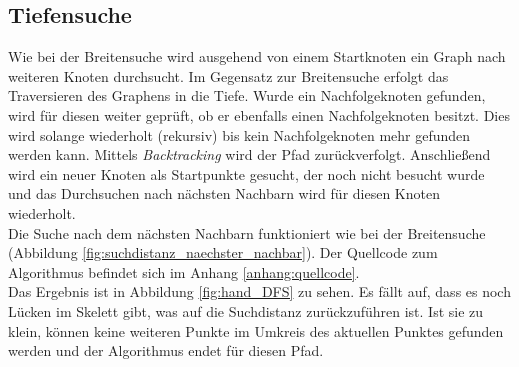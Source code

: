 \subsection{Tiefensuche}
\label{subsec:tiefensuche}
Wie bei der Breitensuche wird ausgehend von einem Startknoten ein Graph nach weiteren Knoten durchsucht. 
Im Gegensatz zur Breitensuche erfolgt das Traversieren des Graphens in die Tiefe. Wurde ein Nachfolgeknoten
gefunden, wird für diesen weiter geprüft, ob er ebenfalls einen Nachfolgeknoten besitzt. Dies wird
solange wiederholt (rekursiv) bis kein Nachfolgeknoten mehr gefunden werden kann. Mittels \emph{Backtracking} wird der Pfad zurückverfolgt. Anschließend wird ein neuer Knoten als Startpunkte gesucht, der noch nicht besucht wurde und das Durchsuchen nach nächsten Nachbarn wird für diesen Knoten wiederholt.\\
Die Suche nach dem nächsten Nachbarn funktioniert wie bei der Breitensuche (Abbildung \ref{fig:suchdistanz_naechster_nachbar}). Der Quellcode zum Algorithmus befindet sich im Anhang \ref{anhang:quellcode}. \\
Das Ergebnis ist in Abbildung \ref{fig:hand_DFS} zu sehen. Es fällt auf, dass es noch Lücken im Skelett gibt, was auf die Suchdistanz zurückzuführen ist. Ist sie zu klein, können keine weiteren Punkte im Umkreis des aktuellen Punktes gefunden werden und der Algorithmus endet für diesen Pfad. 
